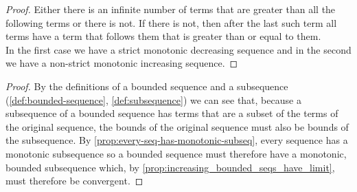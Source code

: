 \documentclass[../MathsNotesBase.tex]{subfiles}
\begin{document}
		\bigskip
		\begin{proof}
			Either there is an infinite number of terms that are greater than all the following terms or there is not. If there is not, then after the last such term all terms have a term that follows them that is greater than or equal to them.\\
			In the first case we have a strict monotonic decreasing sequence and in the second we have a non-strict monotonic increasing sequence.
		\end{proof}
	
		\begin{proof}
			By the definitions of a bounded sequence and a subsequence (\ref{def:bounded-sequence}, \ref{def:subsequence}) we can see that, because a subsequence of a bounded sequence has terms that are a subset of the terms of the original sequence, the bounds of the original sequence must also be bounds of the subsequence. By \autoref{prop:every-seq-has-monotonic-subseq}, every sequence has a monotonic subsequence so a bounded sequence must therefore have a monotonic, bounded subsequence which, by \autoref{prop:increasing_bounded_seqs_have_limit}, must therefore be convergent.
		\end{proof}
\end{document}

